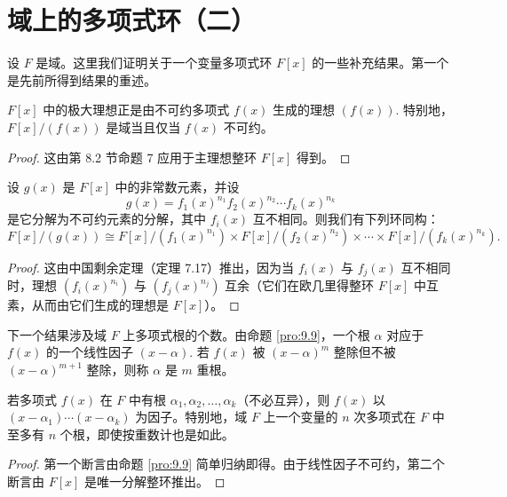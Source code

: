 \section{域上的多项式环（二）}

设 \(F\) 是域。这里我们证明关于一个变量多项式环 \(F[x]\) 的一些补充结果。第一个是先前所得到结果的重述。

\begin{proposition}\label{pro:9.15}
\(F[x]\) 中的极大理想正是由不可约多项式 \(f(x)\) 生成的理想 \((f(x))\). 特别地，\(F[x]/(f(x))\) 是域当且仅当 \(f(x)\) 不可约。
\end{proposition}

\begin{proof}
这由第 8.2 节命题 7 应用于主理想整环 \(F[x]\) 得到。
\end{proof}

\begin{proposition}\label{pro:9.16}
设 \(g(x)\) 是 \(F[x]\) 中的非常数元素，并设
\[
g(x) = f_1(x)^{n_1}f_2(x)^{n_2}\cdots f_k(x)^{n_k}
\]
是它分解为不可约元素的分解，其中 \(f_i(x)\) 互不相同。则我们有下列环同构：
\[
F[x]/(g(x)) \cong F[x]/(f_1(x)^{n_1}) \times F[x]/(f_2(x)^{n_2}) \times \cdots \times F[x]/(f_k(x)^{n_k}).
\]
\end{proposition}

\begin{proof}
这由中国剩余定理（定理 7.17）推出，因为当 \(f_i(x)\) 与 \(f_j(x)\) 互不相同时，理想 \((f_i(x)^{n_i})\) 与 \((f_j(x)^{n_j})\) 互余（它们在欧几里得整环 \(F[x]\) 中互素，从而由它们生成的理想是 \(F[x]\)）。
\end{proof}

下一个结果涉及域 \(F\) 上多项式根的个数。由命题 \ref{pro:9.9}，一个根 \(\alpha\) 对应于 \(f(x)\) 的一个线性因子 \((x-\alpha)\). 若 \(f(x)\) 被 \((x-\alpha)^m\) 整除但不被 \((x-\alpha)^{m+1}\) 整除，则称 \(\alpha\) 是 \(m\) 重根。

\begin{proposition}\label{pro:9.17}
若多项式 \(f(x)\) 在 \(F\) 中有根 \(\alpha_1, \alpha_2, \ldots, \alpha_k\)（不必互异），则 \(f(x)\) 以 \((x-\alpha_1)\cdots(x-\alpha_k)\) 为因子。特别地，域 \(F\) 上一个变量的 \(n\) 次多项式在 \(F\) 中至多有 \(n\) 个根，即使按重数计也是如此。
\end{proposition}

\begin{proof}
第一个断言由命题 \ref{pro:9.9} 简单归纳即得。由于线性因子不可约，第二个断言由 \(F[x]\) 是唯一分解整环推出。
\end{proof}

